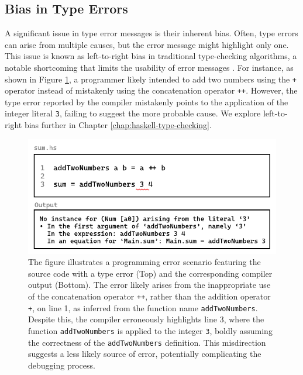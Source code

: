  \subsection*{Bias in Type Errors} 
 \label{subsec:bias}
 
A significant issue in type error messages is their inherent bias. Often, type errors can arise from multiple causes, but the error message might highlight only one. This issue is known as left-to-right bias in traditional type-checking algorithms, a notable shortcoming that limits the usability of error messages \cite{McAdam2002-vb, Lee1998-fx, Chen2014-ev}.  For instance, as shown in Figure \ref{fig:type-error-example}, a programmer likely intended to add two numbers using the \texttt{+} operator instead of mistakenly using the concatenation operator \texttt{++}. However, the type error reported by the compiler mistakenly points to the application of the integer literal \texttt{3}, failing to suggest the more probable cause. We explore left-to-right bias further in Chapter \ref{chap:haskell-type-checking}.

 \begin{figure}[htbp]
  \centering
  \includegraphics[width=\linewidth]{TypeErrorExample}
  \caption[Illustrating a programming error in Haskell, featuring a function named \texttt{addTwoNumbers} with a type error and the corresponding compiler output]{
    \label{fig:type-error-example}
    The figure illustrates a programming error scenario featuring the source code with a type error (Top) and the corresponding compiler output (Bottom). The error likely arises from the inappropriate use of the concatenation operator \texttt{++}, rather than the addition operator \texttt{+}, on line 1, as inferred from the function name \texttt{addTwoNumbers}. Despite this, the compiler erroneously highlights line 3, where the function \texttt{addTwoNumbers} is applied to the integer \texttt{3}, boldly assuming the correctness of the \texttt{addTwoNumbers} definition. This misdirection suggests a less likely source of error, potentially complicating the debugging process.
    }
\end{figure}


